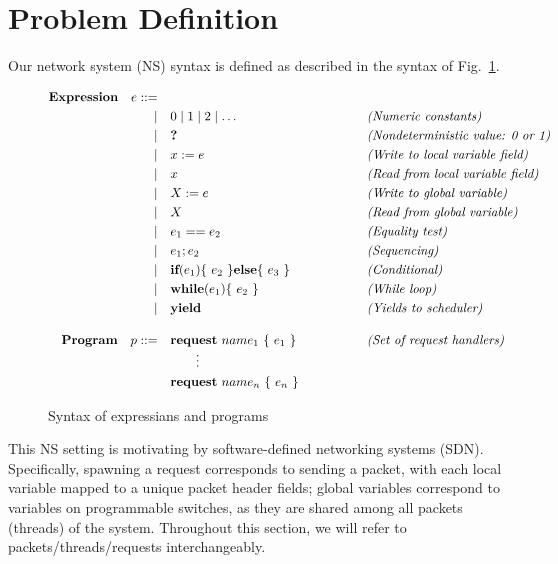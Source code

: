 
\section{Problem Definition}
\label{sec:problem-definition}

Our network system (NS) syntax is defined as described in the syntax of Fig.~\ref{fig:syntax}.
%
\newcommand{\grammartag}[1]{\qquad\qquad\emph{(#1)}}
\begin{figure}[!htbp]
    \begin{align*}
    \mathbf{Expression}\quad e ::= &&& \\
       | & \quad 0 \mid 1 \mid 2 \mid \ldots                                && \grammartag{Numeric constants} \\
       | & \quad \nondet                                 && \grammartag{Nondeterministic value: 0 or 1}\\
       | & \quad x := e                            && \grammartag{Write to local variable field} \\
       | & \quad x                                 && \grammartag{Read from local variable field} \\
       | & \quad X := e                            && \grammartag{Write to global  variable} \\
       | & \quad X                                 && \grammartag{Read from global  variable} \\
       | & \quad e_1 == e_2                        && \grammartag{Equality test} \\
       | & \quad e_1 ; e_2                         && \grammartag{Sequencing} \\
       | & \quad \ifkw(e_1)\{\ e_2\ \}\elsekw\{\ e_3\ \} && \grammartag{Conditional} \\
       | & \quad \whilekw(e_1)\{\ e_2\ \}              && \grammartag{While loop} \\
       | & \quad \yieldkw                      && \grammartag{Yields to scheduler}\\[1em]
    \mathbf{Program}\quad p ::=
        & \quad \requestkw\ name_1\ \{\ e_1\ \}&&\grammartag{Set of request handlers}\\[-0.5em]
        & \quad \qquad \vdots &&\\
        & \quad \requestkw\ name_n\ \{\ e_n\ \}\ 
    \end{align*}
    \caption{Syntax of expressians and programs}
    \label{fig:syntax}
\end{figure}
This NS setting is motivating by software-defined networking systems (SDN). Specifically, spawning a request corresponds to sending a packet, with each local variable mapped to a unique packet header fields; global variables correspond to variables on programmable switches, as they are shared among all packets (threads) of the system. Throughout this section, we will refer to packets/threads/requests interchangeably. 
    
